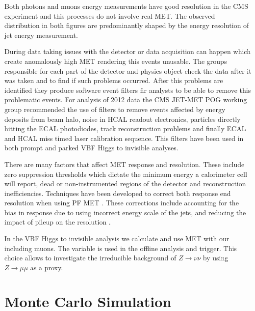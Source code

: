 Both photons and muons energy measurements have good resolution in the \gls{CMS} experiment and this processes do not involve real \gls{MET}. The observed distribution in both figures are predominantly shaped by the energy resolution of jet energy measurement.

During data taking issues with the detector or data acquisition can happen which create anomalously high \gls{MET} rendering this events unusable. The groups responsible for each part of the detector and physics object check the data after it was taken and to find if such problems occurred. After this problems are identified they produce software event filters fir analysts to be able to remove this problematic events. For analysis of 2012 data the \gls{CMS} JET-MET \gls{POG} working group recommended the use of filters to remove events affected by energy deposits from beam halo, noise in \gls{HCAL} readout electronics, particles directly hitting the \gls{ECAL} photodiodes, track reconstruction problems and finally \gls{ECAL} and \gls{HCAL} miss timed laser calibration sequence. This filters have been used in both prompt and parked \gls{VBF} Higgs to invisible analyses.

There are many factors that affect \gls{MET} response and resolution. These include zero suppression thresholds which dictate the minimum energy a calorimeter cell will report, dead or non-instrumented regions of the detector and reconstruction inefficiencies. Techniques have been developed to correct both response end resolution when using \gls{PF} \gls{MET} \cite{ARTICLE:CMSMissingTransverseEnergyPerformance}. These corrections include accounting for the bias in response due to using incorrect energy scale of the jets, and reducing the impact of pileup on the resolution \cite{ARTICLE:CMSMETPerformance8TeV}.

In the \gls{VBF} Higgs to invisible analysis we calculate and use \gls{MET} with our including muons. The variable is used in the offline analysis and trigger. This choice allows to investigate the irreducible background of $Z \rightarrow \nu\nu$ by using $Z \rightarrow \mu\mu$ as a proxy.


\section{Monte Carlo Simulation}
\label{SECTION:EventReconstructionAndSimulation_MonteCarloSimulation}

